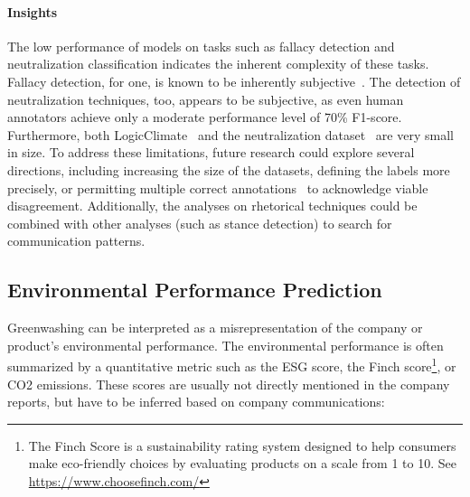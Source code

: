 \paragraph{Insights} The low performance of models on tasks such as fallacy detection and neutralization classification indicates the inherent complexity of these tasks. Fallacy detection, for one, is known to be inherently subjective~\cite{helwe-etal-2024-mafalda}. %
The detection of neutralization techniques, too, appears to be subjective, as even human annotators achieve only a moderate performance level of 70\% F1-score.
Furthermore, both LogicClimate~\cite{jin-etal-2022-logical} and the neutralization dataset~\cite{bhatia_automatic_2021-1} are very small in size.
To address these limitations, future research could explore several directions, including increasing the size of the datasets, defining  the labels more precisely, %
or permitting multiple correct annotations~\cite{helwe-etal-2024-mafalda} to acknowledge viable disagreement. Additionally, the analyses on rhetorical techniques could be combined with other analyses (such as stance detection) to search for communication patterns. 

\subsection{Environmental Performance Prediction}
\label{sec:env prediction}

Greenwashing can be interpreted as a misrepresentation of the company or product's environmental performance. The environmental performance is often summarized by a quantitative metric such as the ESG score, the Finch score\footnote{The Finch Score is a sustainability rating system designed to help consumers make eco-friendly choices by evaluating products on a scale from 1 to 10. See \url{https://www.choosefinch.com/}}, or CO2 emissions. These scores are usually not directly mentioned in the company reports, but have to be inferred based on company communications:

